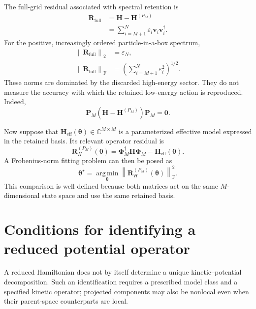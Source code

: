 The full-grid residual associated with spectral retention is
\begin{align}
    \mathbf R_{\mathrm{full}}
    &=
    \mathbf H-\mathbf H^{(P_M)}
    \\
    &=
    \sum_{i=M+1}^{N}
    \varepsilon_i\mathbf v_i\mathbf v_i^\dagger.
\end{align}
For the positive, increasingly ordered particle-in-a-box spectrum,
\begin{align}
    \left\|\mathbf R_{\mathrm{full}}\right\|_2
    &=
    \varepsilon_N,
    \\
    \left\|\mathbf R_{\mathrm{full}}\right\|_{\mathrm F}
    &=
    \left(
        \sum_{i=M+1}^{N}\varepsilon_i^2
    \right)^{1/2}.
\end{align}
These norms are dominated by the discarded high-energy sector. They do not
measure the accuracy with which the retained low-energy action is reproduced.
Indeed,
\begin{equation}
    \mathbf P_M
    \left(
        \mathbf H-\mathbf H^{(P_M)}
    \right)
    \mathbf P_M
    =
    \mathbf 0.
\end{equation}

Now suppose that
$\mathbf H_{\mathrm{eff}}(\boldsymbol\theta)\in\mathbb C^{M\times M}$ is a
parameterized effective model expressed in the retained basis. Its relevant
operator residual is
\begin{equation}
    \mathbf R_H^{(P_M)}(\boldsymbol\theta)
    =
    \boldsymbol\Phi_M^\dagger
    \mathbf H
    \boldsymbol\Phi_M
    -
    \mathbf H_{\mathrm{eff}}(\boldsymbol\theta).
\end{equation}
A Frobenius-norm fitting problem can then be posed as
\begin{equation}
    \boldsymbol\theta^\star
    =
    \operatorname*{arg\,min}_{\boldsymbol\theta}
    \left\|
        \mathbf R_H^{(P_M)}(\boldsymbol\theta)
    \right\|_{\mathrm F}^2.
\end{equation}
This comparison is well defined because both matrices act on the same
$M$-dimensional state space and use the same retained basis.

\section{Conditions for identifying a reduced potential operator}

A reduced Hamiltonian does not by itself determine a unique kinetic--potential
decomposition. Such an identification requires a prescribed model class and a
specified kinetic operator; projected components may also be nonlocal even
when their parent-space counterparts are local.

